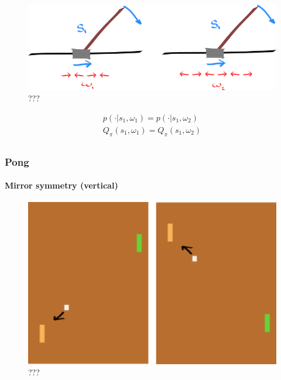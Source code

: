 \begin{figure}
\centering
\includegraphics[width=1\textwidth,height=0.25\textheight]{../../pictures/drawings/cart-pole-temporal-approx.png}
\caption{???}
\end{figure}

\begin{align}
p(\cdot|s_1, \omega_1) = p(\cdot|s_1, \omega_2) \\
Q_{\pi}(s_1, \omega_1) = Q_{\pi}(s_1,\omega_2) \\
\end{align}

\hypertarget{pong}{%
\subsubsection{Pong}\label{pong}}

\hypertarget{mirror-symmetry-vertical}{%
\paragraph{Mirror symmetry (vertical)}\label{mirror-symmetry-vertical}}

\begin{figure}
\centering
\includegraphics[width=1\textwidth,height=0.25\textheight]{../../pictures/drawings/pong-vert-flip.png}
\caption{???}
\end{figure}

